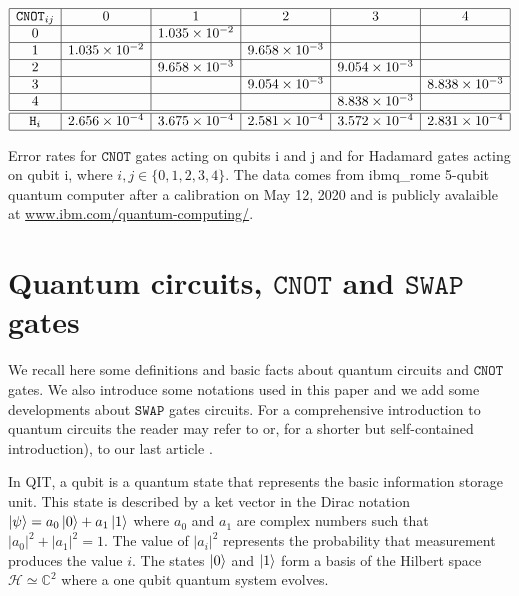 \documentclass[a4paper,12pt,fleqn]{article}
\newcommand\swap{\mathtt{SWAP}}
\newcommand\cnot{\mathtt{CNOT}}
\newcommand\HH{\mathcal{H}}
\newcommand\C{\mathbb{C}}
\begin{document}
\begin{table}[h]
  \begin{center}
  $\begin{array}{|c|c|c|c|c|c|}\hline
    \cnot_{ij}&0&1&2&3&4\\\hline
    0&&1.035\times 10^{-2}&&& \\\hline
    1&1.035\times 10^{-2}&&9.658\times 10^{-3}&& \\\hline
    2&&9.658\times 10^{-3}&&9.054\times 10^{-3}& \\\hline
    3&&&9.054\times 10^{-3}&&8.838\times 10^{-3}\\\hline
    4&&&&8.838\times 10^{-3}&\\\hline\hline
     \mathtt{H}_i&2.656\times 10^{-4}&3.675\times 10^{-4}&2.581\times 10^{-4}&3.572\times 10^{-4}&2.831\times 10^{-4}\\\hline
   \end{array}$
 \end{center} 
   { \caption{ Error rates for $\cnot$ gates acting on qubits i and j and for Hadamard gates acting on qubit i, where $i,j\in\{0,1,2,3,4\}$.
     The data comes from ibmq\_rome 5-qubit quantum computer after a calibration on May 12, 2020 and is publicly avalaible at \url{www.ibm.com/quantum-computing/}.\label{errors}} }
\end{table}

\section{Quantum circuits, $\cnot$ and $\swap$ gates\label{background}}

We recall here some definitions and basic facts about quantum circuits and $\cnot$ gates. We also introduce some notations
used in this paper and we add some developments about $\swap$ gates circuits. For a comprehensive introduction to quantum circuits the reader may refer to \cite[Chapter 4]{NCI2011}
or, for a shorter but self-contained introduction), to our last article \cite{MBJGL2019}. 


In QIT, a qubit is a quantum state that represents the basic information
storage unit. This state is described by a ket vector in the Dirac notation $\ket{\psi} = a_0 \ket{0} + a_1\ket{1}$ where $a_0$ and $a_1$ are complex numbers
such that $|a_0|^2 + |a_1|^2= 1$. The value of $|a_i|^2$ represents the probability that measurement produces
the value $i$. The states $\ket{0}$ and $\ket{1}$ form a basis of the Hilbert space $\HH\simeq \C^2$ where a one qubit quantum system evolves.
\end{document}
